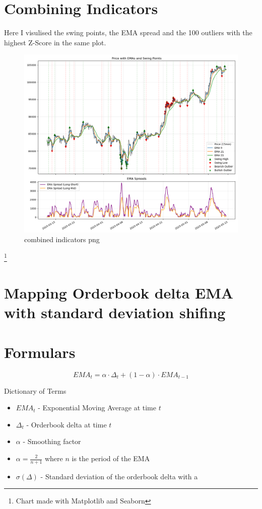 \documentclass[12pt]{article}
\begin{document}
\newpage
\section*{Combining Indicators}
Here I visulised the swing points, the EMA spread and the 100 outliers with the highest Z-Score in the same plot.

\begin{figure}[H]
    \centering
    \includegraphics[width=\textwidth]{imgs/swingpoints_emaspread_priceOutliers.png}
    \caption{combined indicators png}
\end{figure}

\footnote{Chart made with Matplotlib and Seaborn}


\newpage
\section*{Mapping Orderbook delta EMA with standard deviation shifing}
\section*{Formulars}

\begin{equation}
  EMA_t = \alpha \cdot \Delta_t + (1 - \alpha) \cdot EMA_{t-1}
\end{equation}

Dictionary of Terms

\begin{itemize}
  \item $EMA_t$ - Exponential Moving Average at time $t$
  \item $\Delta_t$ - Orderbook delta at time $t$
  \item $\alpha$ - Smoothing factor 
  \item $\alpha = \frac{2}{n+1}$ where $n$ is the period of the EMA
  \item $\sigma(\Delta)$ - Standard deviation of the orderbook delta with a 
\end{itemize}
\end{document}
